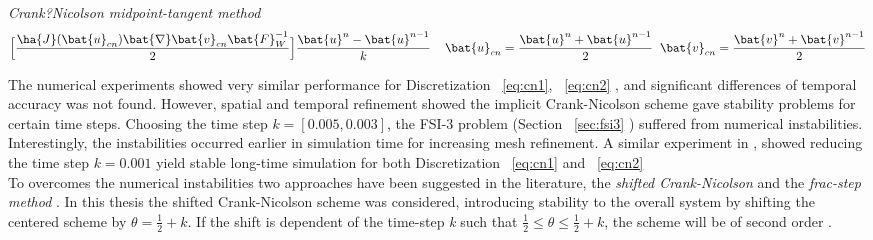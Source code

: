 \begin{discr}
\textit{Crank?Nicolson midpoint-tangent method}
\begin{align*}
\Big[\frac{\ha{J}(\bat{u}_{cn}) \bat{\nabla} \bat{v}_{cn} \bat{F}_W^{-1}}{2} \Big] 
\frac{\bat{u}^{n} - \bat{u}^{n-1}}{k} \hspace{4mm}
\bat{u}_{cn} = \frac{\bat{u}^{n} + \bat{u}^{n-1}}{2} \hspace{2mm}
\bat{v}_{cn} = \frac{\bat{v}^{n} + \bat{v}^{n-1}}{2}
\end{align*} 
\label{eq:cn2}
\end{discr}
\newpage
The numerical experiments showed very similar performance for Discretization  ~\ref{eq:cn1}, ~\ref{eq:cn2} , and significant differences of temporal accuracy was not found. However, spatial and temporal refinement showed the implicit Crank-Nicolson scheme gave stability problems for certain time steps. Choosing the time step $k = [0.005, 0.003]$, the FSI-3 problem (Section  ~\ref{sec:fsi3} ) suffered from numerical instabilities. Interestingly, the instabilities occurred earlier in simulation time for increasing mesh refinement. A similar experiment in  \cite{Wicka}, showed reducing the time step $k = 0.001$  yield stable long-time simulation for both  Discretization  ~\ref{eq:cn1} and ~\ref{eq:cn2}    \\
To overcomes the numerical instabilities two approaches have been suggested in the literature,  the \textit{shifted Crank-Nicolson}  and the \textit{frac-step method}  \cite{Richter2015, Wicka, Wick2013a}.  In this thesis the shifted Crank-Nicolson scheme was considered, introducing stability to the overall system by shifting the centered scheme  by $\theta = \frac{1}{2} + k$. If the shift is dependent of the time-step \textit{k} such that $\frac{1}{2} \leq \theta \leq \frac{1}{2} + k$, the scheme will be of second order \cite{Richter2015}. \\
